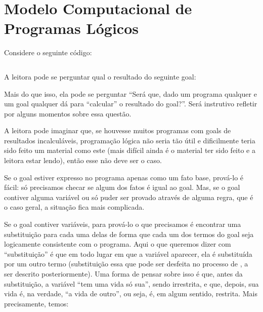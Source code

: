 \documentclass{article}
\begin{document}
\section{Modelo Computacional de Programas Lógicos}

Considere o seguinte código:


\inputminted{prolog}{../Exemplos/Cap1/prog1_circuito.pl}

A leitora pode se perguntar qual o resultado do seguinte goal:


 Mais do que isso, ela pode se perguntar ``Será que, dado um programa qualquer e um goal qualquer dá para ``calcular'' o resultado
 do goal?''. Será instrutivo refletir por alguns momentos sobre essa questão.


A leitora pode imaginar que, se houvesse muitos programas com goals de resultados incalculáveis, programação lógica não seria tão útil e dificilmente teria sido feito um material como este (mais difícil ainda é o material ter sido feito e a leitora estar lendo), então esse não deve ser o caso.

Se o goal estiver expresso no programa apenas como um fato base, prová-lo é fácil: só precisamos checar se algum dos fatos é igual ao goal. Mas, se o goal contiver alguma variável ou só puder ser provado através de alguma regra, que é o caso geral, a situação fica mais complicada.

Se o goal contiver variáveis, para prová-lo o que precisamos é encontrar uma substituição para cada uma delas de forma
que cada um dos termos do goal seja logicamente consistente com o programa. Aqui o que queremos dizer com ``substituição'' é que em todo lugar em que a variável aparecer, ela é substituída por um outro termo (substituição essa que pode ser desfeita no processo de , a ser descrito posteriormente).
Uma forma de pensar sobre isso é que, antes da substituição, a variável ``tem uma vida só
sua'', sendo irrestrita, e que, depois, sua vida é, na verdade, ``a vida de
outro'', ou seja, é, em algum sentido, restrita. Mais precisamente, temos:\\
\end{document}

